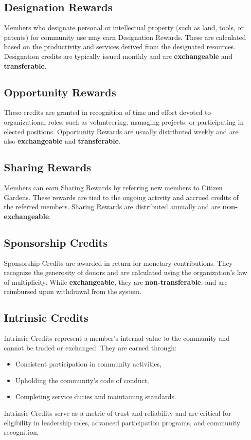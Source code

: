 \documentclass[12pt]{article}
\begin{document}
\subsection{Designation Rewards}
Members who designate personal or intellectual property (such as land, tools, or patents) for community use may earn Designation Rewards. These are calculated based on the productivity and services derived from the designated resources. Designation credits are typically issued monthly and are \textbf{exchangeable} and \textbf{transferable}.

\subsection{Opportunity Rewards}
These credits are granted in recognition of time and effort devoted to organizational roles, such as volunteering, managing projects, or participating in elected positions. Opportunity Rewards are usually distributed weekly and are also \textbf{exchangeable} and \textbf{transferable}.

\subsection{Sharing Rewards}
Members can earn Sharing Rewards by referring new members to Citizen Gardens. These rewards are tied to the ongoing activity and accrued credits of the referred members. Sharing Rewards are distributed annually and are \textbf{non-exchangeable}.

\subsection{Sponsorship Credits}
Sponsorship Credits are awarded in return for monetary contributions. They recognize the generosity of donors and are calculated using the organization's law of multiplicity. While \textbf{exchangeable}, they are \textbf{non-transferable}, and are reimbursed upon withdrawal from the system.

\subsection{Intrinsic Credits}
Intrinsic Credits represent a member’s internal value to the community and cannot be traded or exchanged. They are earned through:
\begin{itemize}
  \item Consistent participation in community activities,
  \item Upholding the community’s code of conduct,
  \item Completing service duties and maintaining standards.
\end{itemize}
Intrinsic Credits serve as a metric of trust and reliability and are critical for eligibility in leadership roles, advanced participation programs, and community recognition.
\end{document}
